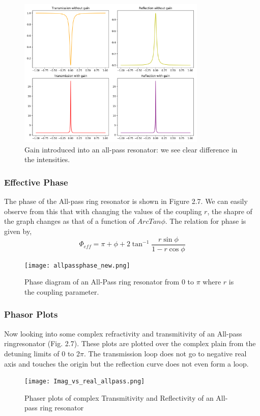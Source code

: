 \begin{figure}[h]
\centering
\includegraphics[width=0.80\textwidth]{all-pall_gain.png}
\caption{Gain introduced into an all-pass resonator: we see clear difference in the intensities.}
\end{figure}


\subsubsection{Effective Phase}
The phase of the All-pass ring resonator is shown in Figure 2.7. We can easily observe from this that with changing the values of the coupling $r$, the shapre of the graph changes as that of a function of $ArcTan\phi$. The relation for phase is given by,
\begin{equation}
\Phi_{eff} = \pi + \phi + 2\tan^{-1}\frac{r\sin\phi}{1-r\cos\phi}
\end{equation}

\begin{figure}[h]
\centering
\texttt{[image: allpassphase\_new.png]}
\caption{Phase diagram of an All-Pass ring resonator from 0 to $\pi$ where $r$ is the coupling parameter.}
\end{figure}
\newpage

\subsubsection{Phasor Plots}
Now looking into some complex refractivity and transmitivity of an All-pass ringresonator (Fig. 2.7). These plots are plotted over the complex plain from the detuning limits of 0 to 2$\pi$. The transmission loop does not go to negative real axis and touches the origin but the reflection curve does not even form a loop.
\begin{figure}[h]
\centering
\texttt{[image: Imag\_vs\_real\_allpass.png]}
\caption{Phaser plots of complex Transmitivity and Reflectivity of an All-pass ring resonator}
\end{figure}
\newpage

